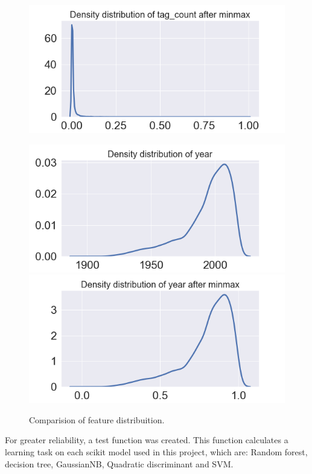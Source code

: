 \documentclass[../main]{subfiles}
\begin{document}
\begin{figure}[htb]
\begin{minipage}[t]{.19\linewidth}
        \includegraphics[width=\linewidth]{figures/minmax_tag_count.png}
    \end{minipage}  
    \begin{minipage}[t]{.19\linewidth}
        \centering
        \includegraphics[width=\linewidth]{figures/original_year.png}
        \includegraphics[width=\linewidth]{figures/minmax_year.png}
    \end{minipage}    
    \label{fig:distribuition_features}
    \caption{Comparision of feature distribuition.}
\end{figure}
For greater reliability, a test function was created. This function calculates a learning task on each scikit model used in this project, which are: Random forest, decision tree, GaussianNB, Quadratic discriminant and SVM.
\end{document}
